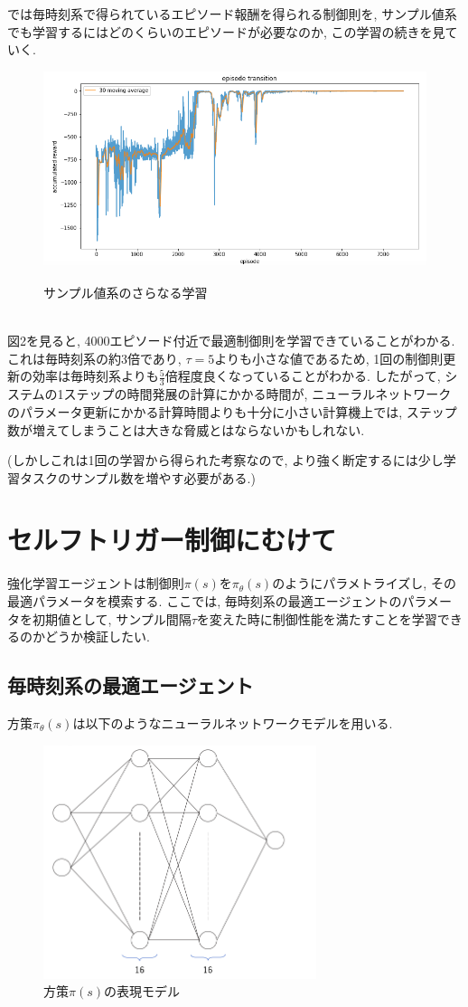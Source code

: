 \documentclass{jsarticle}
\begin{document}
では毎時刻系で得られているエピソード報酬を得られる制御則を, サンプル値系でも学習するにはどのくらいのエピソードが必要なのか, この学習の続きを見ていく.
\begin{figure}[h]
	\centering
 	\includegraphics[width=12cm]{sample_value.png} \label{sample_value}
 	\caption{サンプル値系のさらなる学習}
\end{figure}\\
図2を見ると, 4000エピソード付近で最適制御則を学習できていることがわかる. これは毎時刻系の約3倍であり, $\tau=5$よりも小さな値であるため, 1回の制御則更新の効率は毎時刻系よりも$\frac{5}{3}$倍程度良くなっていることがわかる. したがって, システムの1ステップの時間発展の計算にかかる時間が, ニューラルネットワークのパラメータ更新にかかる計算時間よりも十分に小さい計算機上では, ステップ数が増えてしまうことは大きな脅威とはならないかもしれない.\par
(しかしこれは1回の学習から得られた考察なので, より強く断定するには少し学習タスクのサンプル数を増やす必要がある.)

\section{セルフトリガー制御にむけて}
強化学習エージェントは制御則$\pi(s)$を$\pi_{\theta}(s)$のようにパラメトライズし, その最適パラメータを模索する. ここでは, 毎時刻系の最適エージェントのパラメータを初期値として, サンプル間隔$\tau$を変えた時に制御性能を満たすことを学習できるのかどうか検証したい. 

\subsection{毎時刻系の最適エージェント}
方策$\pi_{\theta}(s)$は以下のようなニューラルネットワークモデルを用いる. 

\begin{figure}[h]
	\centering
 	\includegraphics[width=8cm]{actor.png} 
 	\caption{方策$\pi(s)$の表現モデル}
\end{figure}
\end{document}
